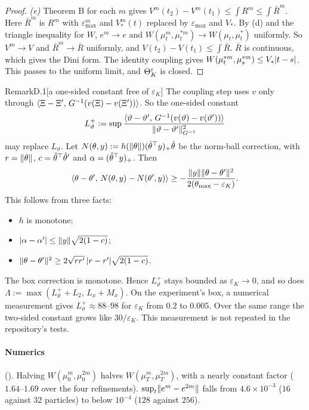 \begin{proof}
\textit{(e)} Theorem B for each $m$ gives $V^m(t_2)-V^m(t_1)\le\int R^m\le\int\bar R^m$. Here $\bar R^m$ is $R^m$
with $\varepsilon^m_{\max}$ and $V^m_*(t)$ replaced by $\varepsilon_{\max}$ and $V_*$. By (d) and the triangle
inequality for $W$, $e^m\to e$ and $W(\mu^m_t,\mu^{*m}_t)\to W(\mu_t,\mu^*_t)$ uniformly. So $V^m\to V$ and
$\bar R^m\to\bar R$ uniformly, and $V(t_2)-V(t_1)\le\int\bar R$. $\bar R$ is continuous, which gives the Dini form.
The identity coupling gives $W(\mu^{*m}_t,\mu^{*m}_s)\le V_*\lvert t-s\rvert$. This passes to the uniform limit, and $\Theta_K^{\varepsilon}$
is closed.
\end{proof}

\begin{rmk}{Remark}{D.1}[a one-sided constant free of $\varepsilon_K$]
The coupling step uses $v$ only through $\langle \Xi-\Xi',\, G^{-1}(v(\Xi)-v(\Xi'))\rangle$. So the one-sided constant
\[
  L_\vartheta^+ := \sup\frac{\langle \vartheta-\vartheta',\, G^{-1}(v(\vartheta)-v(\vartheta'))\rangle}
  {\lVert \vartheta-\vartheta'\rVert^2_{G^{-1}}}
\]
may replace $L_\vartheta$. Let $N(\theta,y):=h(\lVert \theta\rVert)(\hat\theta^\top y)_+\hat\theta$ be the norm-ball
correction, with $r=\lVert \theta\rVert$, $c=\hat\theta^\top\hat\theta'$ and $\alpha=(\hat\theta^\top y)_+$. Then
\[
  \langle \theta-\theta',\, N(\theta,y)-N(\theta',y)\rangle\ge-\frac{\lVert y\rVert\lVert \theta-\theta'\rVert^2}{2(\theta_{\max}-\varepsilon_K)}.
\]
This follows from three facts:
\begin{itemize}
\item $h$ is monotone;
\item $\lvert \alpha-\alpha'\rvert\le\lVert y\rVert\sqrt{2(1-c)}$;
\item $\lVert \theta-\theta'\rVert^2\ge2\sqrt{rr'}\,\lvert r-r'\rvert\sqrt{2(1-c)}$.
\end{itemize}
The box correction is monotone. Hence $L_\vartheta^+$ stays bounded as $\varepsilon_K\to0$, and so does
$\Lambda:=\max(L_\vartheta^++L_2,\,L_x+M_x)$. On the experiment's box, a numerical measurement gives
$L_\vartheta^+\approx88$--$98$ for $\varepsilon_K$ from $0.2$ to $0.005$. Over the same range the two-sided constant
grows like $30/\varepsilon_K$. This measurement is not repeated in the repository's tests.
\end{rmk}

\paragraph{Numerics} (). Halving $W(\mu^m_0,\mu^{2m}_0)$ halves
$W(\mu^m_T,\mu^{2m}_T)$, with a nearly constant factor ($1.64$--$1.69$ over the four refinements). $\sup_t\lVert e^m-e^{2m}\rVert$ falls from $4.6\times10^{-3}$
($16$ against $32$ particles) to below $10^{-4}$ ($128$ against $256$).

